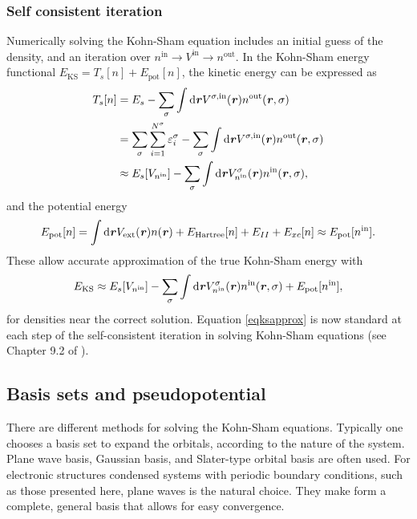 \subsubsection{Self consistent iteration}
Numerically solving the Kohn-Sham equation includes an initial guess of the density,
and an iteration over $n^\text{in}\rightarrow V^\text{in}\rightarrow n^\text{out}$.
In the Kohn-Sham energy functional $E_\text{KS}=T_s[n]+E_\text{pot}[n]$, the kinetic
energy can be expressed as
%
\begin{equation}
\begin{aligned}
T_s[n] & =E_s-\sum_\sigma\int \mathrm{d}\textbf{\textit{r}} V^{\sigma,\text{in}}(\textbf{\textit{r}})n^\text{out}(\textbf{\textit{r}},\sigma) \\
 & =\sum_\sigma\sum_{i=1}^{N^\sigma}\varepsilon_i^\sigma-\sum_\sigma\int \mathrm{d}\textbf{\textit{r}} V^{\sigma,\text{in}}(\textbf{\textit{r}})n^\text{out}(\textbf{\textit{r}},\sigma) \\
& \approx E_s[V_{n^\text{in}}]-\sum_\sigma\int \mathrm{d}\textbf{\textit{r}} V^{\sigma}_{n^\text{in}}(\textbf{\textit{r}})n^\text{in}(\textbf{\textit{r}},\sigma), \label{eqtshwf}
\end{aligned}
\end{equation}
and the potential energy
\begin{equation}
E_\text{pot}[n]=\int \mathrm{d}\textbf{\textit{r}} V_\text{ext}(\textbf{\textit{r}})n(\textbf{\textit{r}})+E_\text{Hartree}[n]+E_{II}+E_{xc}[n]\approx E_\text{pot}[n^\text{in}]. \label{eqpot}
\end{equation}
These allow accurate approximation of the true Kohn-Sham energy with 
\begin{equation}
 E_\text{KS} \approx E_s[V_{n^\text{in}}]-\sum_\sigma\int \mathrm{d}\textbf{\textit{r}} V^{\sigma}_{n^\text{in}}(\textbf{\textit{r}})n^\text{in}(\textbf{\textit{r}},\sigma)+E_\text{pot}[n^\text{in}] \label{eqksapprox},
\end{equation}
for densities near the correct solution. Equation \ref{eqksapprox} is now standard at each step of the self-consistent iteration in solving Kohn-Sham equations (see Chapter 9.2 of \cite{martin-esbook}).

\subsection{Basis sets and pseudopotential}
There are different methods for solving the Kohn-Sham equations. Typically one
chooses a basis set to expand the orbitals, according to the nature of the system.
Plane wave basis, Gaussian basis, and Slater-type orbital basis are often used.  For
electronic structures condensed systems with periodic boundary conditions, such as
those presented here, plane waves is the  natural choice.  They make form a complete,
general basis that allows for easy convergence.

